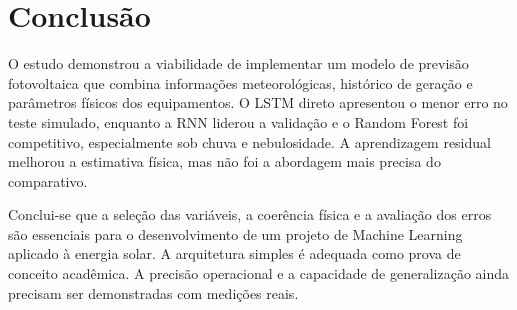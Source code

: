 \section{Conclusão}
O estudo demonstrou a viabilidade de implementar um modelo de previsão fotovoltaica que combina informações meteorológicas, histórico de geração e parâmetros físicos dos equipamentos. O LSTM direto apresentou o menor erro no teste simulado, enquanto a RNN liderou a validação e o Random Forest foi competitivo, especialmente sob chuva e nebulosidade. A aprendizagem residual melhorou a estimativa física, mas não foi a abordagem mais precisa do comparativo.

Conclui-se que a seleção das variáveis, a coerência física e a avaliação dos erros são essenciais para o desenvolvimento de um projeto de Machine Learning aplicado à energia solar. A arquitetura simples é adequada como prova de conceito acadêmica. A precisão operacional e a capacidade de generalização ainda precisam ser demonstradas com medições reais.